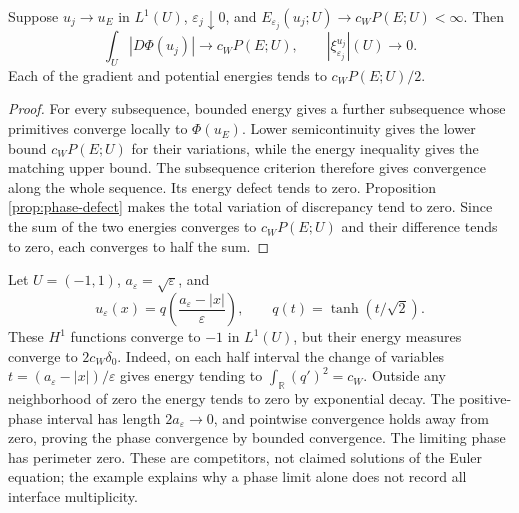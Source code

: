 \begin{corollary}\label{cor:phase-equipartition}
Suppose $u_j\to u_E$ in $L^1(U)$, $\varepsilon_j\downarrow0$, and
$E_{\varepsilon_j}(u_j;U)\to c_WP(E;U)<\infty$. Then
\[
 \int_U|D\Phi(u_j)|\to c_WP(E;U),\qquad
 |\xi_{\varepsilon_j}^{u_j}|(U)\to0.
\]
Each of the gradient and potential energies tends to $c_WP(E;U)/2$.
\end{corollary}
\begin{proof}
For every subsequence, bounded energy gives a further subsequence whose primitives converge locally to $\Phi(u_E)$. Lower semicontinuity gives the lower bound $c_WP(E;U)$ for their variations, while the energy inequality gives the matching upper bound. The subsequence criterion therefore gives convergence along the whole sequence. Its energy defect tends to zero. Proposition \ref{prop:phase-defect} makes the total variation of discrepancy tend to zero. Since the sum of the two energies converges to $c_WP(E;U)$ and their difference tends to zero, each converges to half the sum.
\end{proof}

\begin{example}\label{ex:phase-hidden-double-layer}
Let $U=(-1,1)$, $a_\varepsilon=\sqrt\varepsilon$, and
\[
 u_\varepsilon(x)=q\left(\frac{a_\varepsilon-|x|}\varepsilon\right),
 \qquad q(t)=\tanh(t/\sqrt2).
\]
These $H^1$ functions converge to $-1$ in $L^1(U)$, but their energy measures converge to $2c_W\delta_0$. Indeed, on each half interval the change of variables $t=(a_\varepsilon-|x|)/\varepsilon$ gives energy tending to $\int_{\mathbb R}(q')^2=c_W$. Outside any neighborhood of zero the energy tends to zero by exponential decay. The positive-phase interval has length $2a_\varepsilon\to0$, and pointwise convergence holds away from zero, proving the phase convergence by bounded convergence. The limiting phase has perimeter zero. These are competitors, not claimed solutions of the Euler equation; the example explains why a phase limit alone does not record all interface multiplicity.
\end{example}
